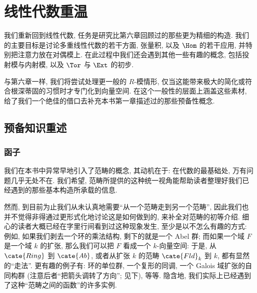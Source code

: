
\chapter{线性代数重温}
\label{chap:linear-algebra-reprise}


我们重新回到线性代数, 任务是研究比第六章回顾过的那些更为精细的构造. 我们的主要目标是讨论多重线性代数的若干方面, 张量积, 以及 $\Hom$ 的若干应用, 并特别把注意力放在对偶模上. 在此过程中我们还会遇到其他一些有趣的概念, 包括投射模与内射模, 以及 $\Tor$ 与 $\Ext$ 的初步.

与第六章一样, 我们将尝试处理更一般的 $R$-模情形, 仅当这能带来极大的简化或符合根深蒂固的习惯时才专门化到向量空间. 在这个一般性的层面上涵盖这些素材, 给了我们一个绝佳的借口去补充本书第一章描述过的那些预备性概念.

\section{预备知识重述}
\label{sec:lin-alg-reprise-1}

\subsection{函子}
\label{subsec:functors}

我们在本书中异常早地引入了范畴的概念, 其动机在于: 在代数的最基础处, 万有问题几乎无处不在. 我们希望, 范畴所提供的这种统一视角能帮助读者整理好我们已经遇到的那些基本构造所承载的信息.

然而, 到目前为止我们从未认真地需要``从一个范畴走到另一个范畴'', 因此我们也并不觉得非得通过更形式化地讨论这是如何做到的, 来补全对范畴的初等介绍. 细心的读者大概已经在字里行间看到过这种现象发生, 至少是以不怎么有趣的方式: 例如, 如果我们剥去一个环的乘法结构, 剩下的就是一个 Abel 群; 而如果一个域 $F$ 是一个域 $k$ 的扩张, 那么我们可以把 $F$ 看成一个 $k$-向量空间: 于是, 从 $\cate{Ring}$ 到 $\cate{Ab}$, 或者从扩张 $k$ 的范畴 $\cate{Fld}_k$ 到 $k$, 都有显然的``走法''. 更有趣的例子有: 环的单位群, 一个复形的同调, 一个 Galois 域扩张的自同构群 (注意后者``把箭头调转了方向''; 见下), 等等. 隐含地, 我们实际上已经遇到了这种``范畴之间的函数''的许多实例.

